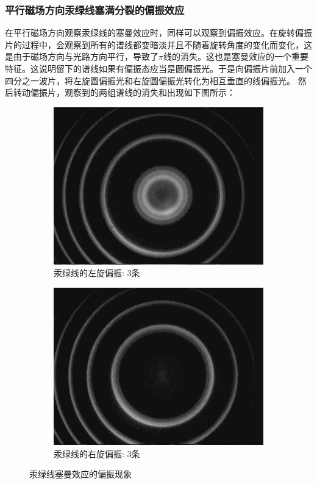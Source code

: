 \documentclass[12pt,a4paper]{article}
\begin{document}
\subsubsection{平行磁场方向汞绿线塞满分裂的偏振效应}
在平行磁场方向观察汞绿线的塞曼效应时，同样可以观察到偏振效应。在旋转偏振片的过程中，会观察到所有的谱线都变暗淡并且不随着旋转角度的变化而变化，这是由于磁场方向与光路方向平行，导致了$\pi$线的消失。这也是塞曼效应的一个重要特征。这说明留下的谱线如果有偏振态应当是圆偏振光。于是向偏振片前加入一个四分之一波片，将左旋圆偏振光和右旋圆偏振光转化为相互垂直的线偏振光。
然后转动偏振片，观察到的两组谱线的消失和出现如下图所示：
\begin{figure}[H]
    \centering
    \begin{subfigure}[b]{0.45\textwidth}
      \centering
      \includegraphics[width=\textwidth]{MultiRing@2.50A_CircularlPolorizedA.jpg}
      \caption{汞绿线的左旋偏振: 3条}
    \end{subfigure}
    \hfill
    \begin{subfigure}[b]{0.45\textwidth}
      \centering
      \includegraphics[width=\textwidth]{MultiRing@2.50A_CircularlPolorizedB.jpg}
      \caption{汞绿线的右旋偏振: 3条}
    \end{subfigure}
  \caption{汞绿线塞曼效应的偏振现象}
  \end{figure}
\end{document}

